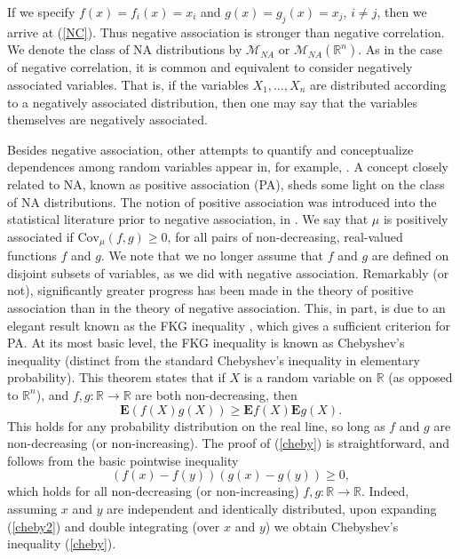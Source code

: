 \documentclass[11pt]{article}
\newcommand{\E}{\mathbf{E}}
\newcommand{\R}{\mathbb{R}}
\newcommand{\m}{\mathcal{M}}
\newcommand{\C}{\text{Cov}}
\begin{document}
If we specify $f(x)=f_i(x)=x_i$ and $g(x)=g_j(x)=x_j$, $i\neq j$, then we arrive at (\ref{NC}). Thus negative association is stronger than negative correlation.
We denote the class of NA distributions
by $\m_{NA}$ or $\m_{NA}(\R^n).$ As in the case of negative correlation, it is common and equivalent to consider negatively associated variables. That is, if the variables $X_1,\dots, X_n$ are distributed according to a negatively associated distribution, then one may say that the variables themselves are negatively associated. 

Besides negative association, other attempts to quantify and conceptualize dependences among random variables appear in, for example, \cite{Block,Ebra,Jog,Karlin}.
A concept closely related to NA, known as positive association (PA), sheds some light on the class of NA distributions. The notion of positive association was introduced into the statistical literature prior to negative association, in \cite{Esary}. We say that $\mu$ is positively associated if $\C_{\mu}(f,g)\geq 0$, for all pairs of non-decreasing, real-valued functions $f$ and $g$. We note that we no longer assume that $f$ and $g$ are defined on disjoint subsets of variables, as we did with negative association. Remarkably (or not), significantly greater progress has been made in the theory of positive association than in the theory of negative association.  This, in part, is due to an elegant result known as the FKG inequality \cite{FKG}, which gives a sufficient criterion for PA. At its most basic level, the FKG inequality is known as Chebyshev's inequality \cite{Eaton} (distinct from the standard Chebyshev's inequality in elementary probability). This theorem states that if $X$ is a random variable on $\R$ (as opposed to $\R^n$), and $f,g:\R\to \R$ are both non-decreasing, then 
\begin{equation}\label{cheby}
\E (f(X)g(X)) \geq \E f(X)\E g(X).
\end{equation}
This holds for any probability distribution on the real line, so long as $f$ and $g$ are non-decreasing (or non-increasing). The proof of (\ref{cheby}) is straightforward, and follows from the basic pointwise inequality
\begin{equation}\label{cheby2}
(f(x)-f(y))(g(x)-g(y)) \geq 0,
\end{equation}
which holds for all non-decreasing (or non-increasing) $f,g :\R\to \R$. Indeed, assuming $x$ and $y$ are independent and identically distributed, upon expanding (\ref{cheby2}) and double integrating (over $x$ and $y$) we obtain Chebyshev's inequality (\ref{cheby}).
\end{document}
